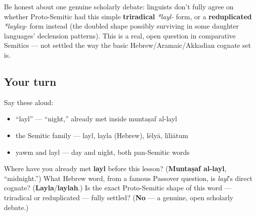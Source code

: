 \begin{culture}
Be honest about one genuine scholarly debate: linguists don't fully agree on whether Proto-Semitic had this simple \textbf{triradical} \emph{*layl-} form, or a \textbf{reduplicated} \emph{*laylay-} form instead (the doubled shape possibly surviving in some daughter languages' declension patterns). This is a real, open question in comparative Semitics — not settled the way the basic Hebrew/Aramaic/Akkadian cognate set is.
\end{culture}

\subsection*{Your turn}
Say these aloud:

\begin{itemize}
\raggedright
  \item \textquotedblleft{}layl\textquotedblright{} — \textquotedblleft{}night,\textquotedblright{} already met inside muntaṣaf al-layl
  \item the Semitic family — layl, layla (Hebrew), lēlyā, līliātum
  \item yawm and layl — day and night, both pan-Semitic words
\end{itemize}

\begin{tcolorbox}[breakable,colback=teal!4,colframe=teal!35!black,title={Before you move on}]
Where have you already met \textbf{layl} before this lesson? (\textbf{Muntaṣaf al-layl}, \textquotedblleft{}midnight.\textquotedblright{}) What Hebrew word, from a famous Passover question, is \emph{layl}'s direct cognate? (\textbf{Layla}/\textbf{laylah}.) Is the exact Proto-Semitic shape of this word — triradical or reduplicated — fully settled? (\textbf{No} — a genuine, open scholarly debate.)
\end{tcolorbox}

